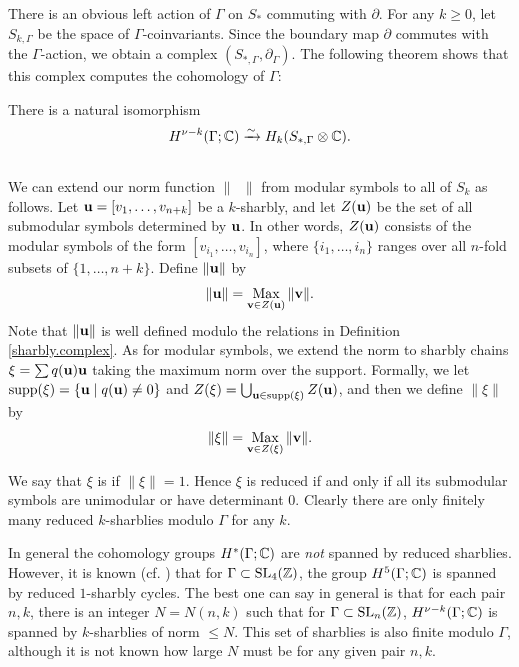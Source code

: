 There is an obvious left action of $\Gamma $ on $S_{* }$ commuting
with $\partial $.  For any $k\geq 0$, let $S_{k,\Gamma }$ be the space
of $\Gamma $-coinvariants.  Since the boundary map $\partial$ commutes
with the $\Gamma $-action, we obtain a complex $(S_{*,\Gamma},
\partial_{\Gamma})$.  The following theorem shows that this complex
computes the cohomology of $\Gamma $:

\begin{theorem}
\label{thm:sharbiso}
There is a natural isomorphism 
\[
H^{\nu - k}(\Gamma ; \mathbb{C}) \xrightarrow{\sim} H_{k}
(S_{*,\Gamma }\otimes \mathbb{C} ).
\]
\end{theorem}

\subsection{}
%
We can extend our norm function $\|\phantom{a}\|$ from modular
symbols to all of $S_{k}$ as follows.  Let ${\mathbf {u}} = [v_{1},\dots
,v_{n+k}]$ be a $k$-sharbly, and let $Z({\mathbf {u}})$ be the set of all
submodular symbols determined by ${\mathbf {u}}$.  In other words, $Z ({\mathbf {u}})$
consists of the modular symbols of the form $[v_{i_{1}},\dotsc
,v_{i_{n}}]$, where $\{i_{1},\dotsc ,i_{n} \}$ ranges over all
$n$-fold subsets of $\{1,\dotsc ,n+k \}$.  Define $\|{\mathbf {u}} \|$ by
\[
\|{\mathbf {u}}\| = \operatorname*{Max}_{{\mathbf {v}} \in Z ({\mathbf {u}} )} \| {\mathbf {v}} \|.
\]
Note that $\| {\mathbf {u}} \|$ is well defined modulo the relations in
Definition \ref{sharbly.complex}.  As for modular symbols, we extend
the norm to sharbly chains $\xi = \sum q ({\mathbf {u}}){\mathbf {u}} $ taking the maximum
norm over the support.  Formally, we let $\operatorname{supp} (\xi) = \{{\mathbf {u}} \mid
q ({\mathbf {u}})\not =0 \}$ and $Z (\xi) = \bigcup_{{\mathbf {u}} \in \operatorname{supp} (\xi )} Z
({\mathbf {u}})$, and then we define $\|\xi \|$ by
\[
\|\xi \| = \operatorname*{Max}_{{\mathbf {v}} \in Z (\xi )} \| {\mathbf {v}} \|.
\]

We say that $\xi $ is  if $\|\xi \| = 1$.  Hence $\xi$
is reduced if and only if all its submodular symbols are unimodular or
have determinant $0$.  Clearly there are only finitely many reduced
$k$-sharblies modulo $\Gamma$ for any $k$.

In general the cohomology groups $H^{*} (\Gamma ; \mathbb{C})$ are \emph{not}
spanned by reduced sharblies.  However, it is known (cf. \cite{M91})
that for $\Gamma \subset \operatorname{SL} _{4} (\mathbb{Z} )$, the group $H^{5} (\Gamma ;
\mathbb{C})$ is spanned by reduced $1$-sharbly cycles.  The best one can say
in general is that for each pair $n,k$, there is an integer $N=N
(n,k)$ such that for $\Gamma \subset \operatorname{SL}_{n} (\mathbb{Z})$, $H^{\nu -k}
(\Gamma; \mathbb{C})$ is spanned by $k$-sharblies of norm $\leq N$.  This set
of sharblies is also finite modulo $\Gamma$, although it is not known
how large $N$ must be for any given pair $n,k$.

